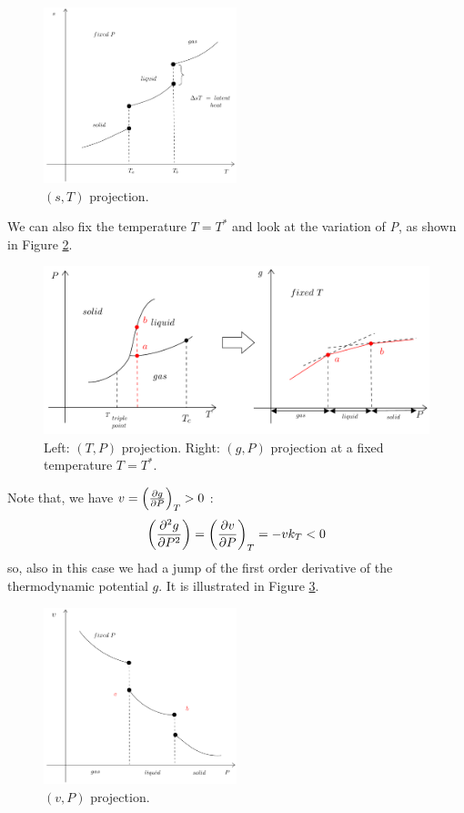 \documentclass[../../Main/Main.tex]{subfiles}
\begin{document}
\begin{figure}[h!]
\centering
\includegraphics[width=0.5\textwidth]{./img/4.pdf}
\caption{\label{fig:2_4} \( (s,T) \) projection. }
\end{figure}


We can also fix the temperature \( T=T^* \)  and look at the variation of \emph{P}, as shown in Figure \ref{fig:2_5}.

\begin{figure}[h!]
\centering
\includegraphics[width=1\textwidth]{./img/5.pdf}
\caption{\label{fig:2_5} Left: \( (T,P) \) projection. Right:  \( (g,P) \) projection at a fixed temperature \( T = T^* \).}
\end{figure}

\noindent
Note that, we have  \( v= \qty(\pdv{g}{P} )_T > 0  \) :
\begin{equation}
  \qty(\pdv[2]{g}{P} ) = \qty(\pdv{v}{P} )_T = -v k_T < 0
  \label{eq:}
\end{equation}
so, also in this case we had a jump of the first order derivative of the thermodynamic potential \( g \).
It is illustrated in Figure \ref{fig:2_6}.


\begin{figure}[h!]
\centering
\includegraphics[width=0.5\textwidth]{./img/6.pdf}
\caption{\label{fig:2_6} \( (v,P) \) projection.}
\end{figure}
\end{document}
